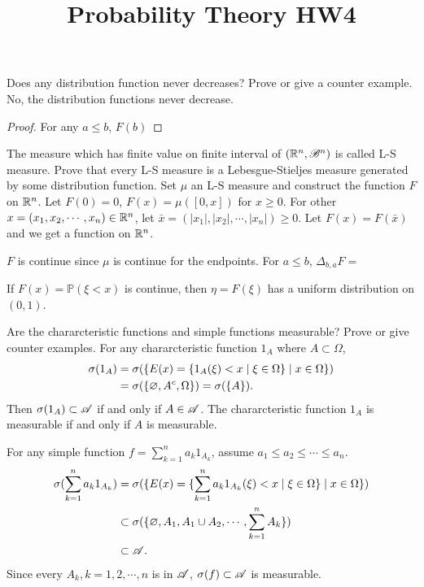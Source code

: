 

\title{Probability Theory HW4}
\author{\asemail}
\maketitle

\begin{enumerate}
	\isep[1em]
\prob
Does any distribution function never decreases? Prove or give a counter example.
\soln
No, the distribution functions never decrease.
\begin{proof}
	For any $a\leq b$, $F(b)$\vspace{6cm}
\end{proof}

\prob
The measure which has finite value on finite interval of $(\mathbb{R}^n, \mathscr{B}^n)$ is called L-S measure. Prove that every L-S measure is a Lebesgue-Stieljes measure generated by some distribution function.
\soln
	Set $\mu$ an L-S measure and construct the function $F$ on $\mathbb{R}^n$.
	Let $F(0)=0$, $F(x)=\mu([0,x])$ for $x\geq 0$. 
	For other $x=(x_1,x_2,\cdots,x_n)\in \mathbb{R}^n$, let $\bar{x}=(|x_1|,|x_2|,\cdots,|x_n|)\geq 0$. Let $F(x)=F(\bar{x})$ and we get a function on $\mathbb{R}^n$.

	$F$ is continue since $\mu$ is continue for the endpoints. For $a\leq b$, $\Delta_{b,a}F=$
\newpage
	
\prob
If $F(x)=\mathbb{P}(\xi < x)$ is continue, then $\eta = F(\xi)$ has a uniform distribution on $(0,1)$.
\soln
\medskip \vspace{5cm}

\prob
Are the chararcteristic functions and simple functions measurable? Prove or give counter examples.
\soln
For any chararcteristic function $1_A$ where $A \subset \Omega$,
\begin{align*}
	\sigma(1_A) & =\sigma(\{E(x)=\{1_A(\xi)<x \mid \xi \in \Omega\} \mid x\in \Omega\})
	\\ &=\sigma (\{\varnothing, A^c, \Omega\})=\sigma(\{A\}).
\end{align*}
Then $\sigma(1_A) \subset \mathscr{A}$ if and only if $A\in \mathscr{A}$.
The chararcteristic function $1_A$ is measurable if and only if $A$ is measurable.

For any simple function $f=\sum_{k=1}^n a_k 1_{A_k}$, assume $a_1 \leq a_2 \leq \cdots \leq a_n$.
\begin{align*}
	\sigma(\sum_{k=1}^n a_k 1_{A_k}) & =\sigma(\{E(x)=\{\sum_{k=1}^n a_k 1_{A_k}(\xi)<x \mid \xi \in \Omega\} \mid x\in \Omega\})
	\\ &\subset \sigma (\{\varnothing, A_1, A_1\cup A_2, \cdots , \sum_{k=1}^n A_k\})
	\\ &\subset \mathscr{A}.
\end{align*}
Since every $A_k, k=1,2,\cdots,n$ is in $\mathscr{A}$, $\sigma(f)\subset \mathscr{A}$ is measurable.

\end{enumerate}
